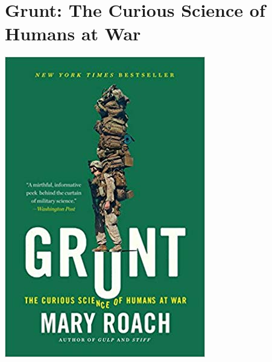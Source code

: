 \documentclass{tufte-handout}
\makeatletter
\newcommand{\varcaption}[2][0pt]{%
  \gsetlength{\@tufte@caption@vertical@offset}{-#1}%
  \gdef\@tufte@stored@varcaption{#2}%
}
\gdef\@tufte@stored@varcaption{} %
\makeatother
\begin{document}
\section*{Grunt: The Curious Science of Humans at War}
\begin{marginfigure}[15\baselineskip]
   \includegraphics[width=\linewidth]{images/grunt.jpg}
   \varcaption{\href{https://www.penguinrandomhouse.com/books/114259/iron-council-by-china-mieville/9780345458421/}{Publisher Link}, \href{https://www.amazon.com/Grunt-Curious-Science-Humans-War/dp/0393354377}{Amazon Link}}
\end{marginfigure}
\end{document}
